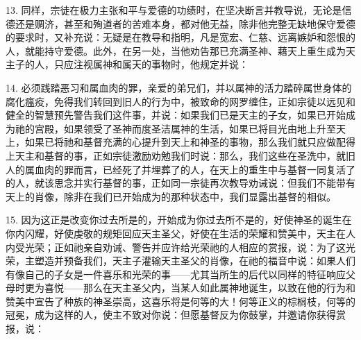 13. 同样，宗徒在极力主张和平与爱德的功绩时，在坚决断言并教导说，无论是信德还是赒济，甚至和殉道者的苦难本身，都对他无益，除非他完整无缺地保守爱德的要求时，又补充说：无疑是在教导和指明，凡是宽宏、仁慈、远离嫉妒和怨恨的人，就能持守爱德。此外，在另一处，当他劝告那已充满圣神、藉天上重生成为天主子的人，只应注视属神和属天的事物时，他规定并说：\par

14. 必须践踏恶习和属血肉的罪，亲爱的弟兄们，并以属神的活力踏碎属世身体的腐化瘟疫，免得我们转回到旧人的行为中，被致命的网罗缠住，正如宗徒以远见和健全的智慧预先警告我们这件事，并说：如果我们已是天主的子女，如果已开始成为祂的宫殿，如果领受了圣神而度圣洁属神的生活，如果已将目光由地上升至天上，如果已将祂和基督充满的心提升到天上和神圣的事物，那么我们就只应做配得上天主和基督的事，正如宗徒激励劝勉我们时说：那么，我们这些在圣洗中，就旧人的属血肉的罪而言，已经死了并埋葬了的人，在天上的重生中与基督一同复活了的人，就该思念并实行基督的事，正如同一宗徒再次教导劝诫说：但我们不能带有天上的肖像，除非在我们已开始成为的那种状态中，我们显露出基督的相似。\par

15. 因为这正是改变你过去所是的，开始成为你过去所不是的，好使神圣的诞生在你内闪耀，好使虔敬的规矩回应天主圣父，好使在生活的荣耀和赞美中，天主在人内受光荣；正如祂亲自劝诫、警告并应许给光荣祂的人相应的赏报，说：为了这光荣，主塑造并预备我们，天主子灌输天主圣父的肖像，在祂的福音中说：如果人们有像自己的子女是一件喜乐和光荣的事——尤其当所生的后代以同样的特征响应父母时更为喜悦——那么在天主圣父内，当某人如此属神地诞生，以致在他的行为和赞美中宣告了种族的神圣崇高，这喜乐将是何等的大！何等正义的棕榈枝，何等的冠冕，成为这样的人，使主不致对你说：但愿基督反为你鼓掌，并邀请你获得赏报，说：\par

